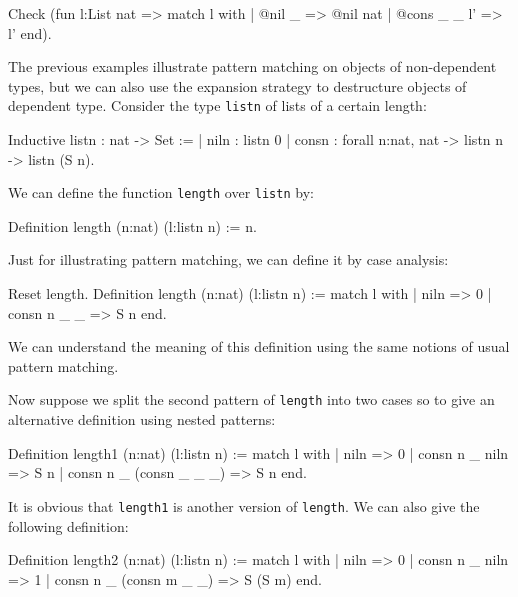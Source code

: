 \begin{coq_example}
Check
  (fun l:List nat =>
     match l with
     | @nil _ => @nil nat
     | @cons _ _ l' => l'
     end).
\end{coq_example}

The previous examples illustrate pattern matching on objects of
non-dependent types, but we can also
use the expansion strategy to destructure objects of dependent type.
Consider the type \texttt{listn} of lists of a certain length:
\label{listn}

\begin{coq_example}
Inductive listn : nat -> Set :=
  | niln : listn 0
  | consn : forall n:nat, nat -> listn n -> listn (S n).
\end{coq_example}

We can define the function \texttt{length} over \texttt{listn} by:

\begin{coq_example}
Definition length (n:nat) (l:listn n) := n.
\end{coq_example}

Just for illustrating pattern matching,
we can define it by case analysis:

\begin{coq_example}
Reset length.
Definition length (n:nat) (l:listn n) :=
  match l with
  | niln => 0
  | consn n _ _ => S n
  end.
\end{coq_example}

We can understand the meaning of this definition using the
same notions of usual pattern matching.

%
%
\iffalse
Now suppose we split the second pattern  of \texttt{length} into two
cases so to give an
alternative definition using nested patterns:
\begin{coq_example}
Definition length1 (n:nat) (l:listn n) :=
  match l with
  | niln => 0
  | consn n _ niln => S n
  | consn n _ (consn _ _ _) => S n
  end.
\end{coq_example}

It is obvious that \texttt{length1} is  another version of
\texttt{length}. We can also give the following definition:
\begin{coq_example}
Definition length2 (n:nat) (l:listn n) :=
  match l with
  | niln => 0
  | consn n _ niln => 1
  | consn n _ (consn m _ _) => S (S m)
  end.
\end{coq_example}


